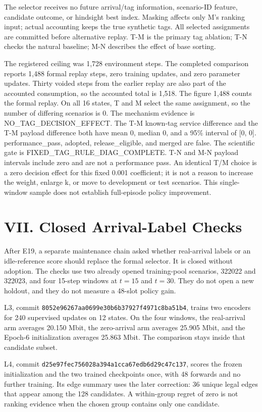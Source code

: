The selector receives no future arrival/tag information, scenario-ID feature, candidate outcome, or hindsight best index. Masking affects only M's ranking input; actual accounting keeps the true synthetic tags. All selected assignments are committed before alternative replay. T-M is the primary tag ablation; T-N checks the natural baseline; M-N describes the effect of base sorting.

The registered ceiling was 1,728 environment steps. The completed comparison reports 1,488 formal replay steps, zero training updates, and zero parameter updates. Thirty voided steps from the earlier replay are also part of the accounted consumption, so the accounted total is 1,518. The figure 1,488 counts the formal replay. On all 16 states, T and M select the same assignment, so the number of differing scenarios is 0. The mechanism evidence is NO\_TAG\_DECISION\_EFFECT. The T-M known-tag service difference and the T-M payload difference both have mean 0, median 0, and a 95\% interval of [0, 0]. performance\_pass, adopted, release\_eligible, and merged are false. The scientific gate is FIXED\_TAG\_RULE\_DIAG\_COMPLETE. T-N and M-N payload intervals include zero and are not a performance pass. An identical T/M choice is a zero decision effect for this fixed 0.001 coefficient; it is not a reason to increase the weight, enlarge k, or move to development or test scenarios. This single-window sample does not establish full-episode policy improvement.

\section*{VII. Closed Arrival-Label Checks}

After E19, a separate maintenance chain asked whether real-arrival labels or an idle-reference score should replace the formal selector. It is closed without adoption. The checks use two already opened training-pool scenarios, 322022 and 322023, and four 15-step windows at $t=15$ and $t=30$. They do not open a new holdout, and they do not measure a 48-slot policy gain.

L3, commit \nolinkurl{8052e96267aa0699e30b6b37927f4971c8ba51b4}, trains two encoders for 240 supervised updates on 12 states. On the four windows, the real-arrival arm averages 20.150 Mbit, the zero-arrival arm averages 25.905 Mbit, and the Epoch-6 initialization averages 25.863 Mbit. The comparison stays inside that candidate subset.

L4, commit \nolinkurl{d25e97fec756028a394a1cca67edb6d29c47c137}, scores the frozen initialization and the two trained checkpoints once, with 48 forwards and no further training. Its edge summary uses the later correction: 36 unique legal edges that appear among the 128 candidates. A within-group regret of zero is not ranking evidence when the chosen group contains only one candidate.

